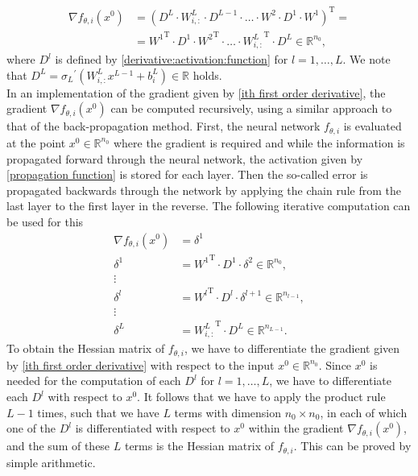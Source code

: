 \begin{equation} 
    \label{ith first order derivative}
    \begin{aligned}
        \nabla f_{\theta, i} \left(x^0\right) & = \left( D^L \cdot W^L_{i,:} \cdot D^{L-1} \cdot \ldots \cdot W^2 \cdot D^1 \cdot W^{1} \right)^{\mathrm{T}} = \\
        & = {W^{1}}^{\mathrm{T}} \cdot D^{1} \cdot {W^{2}}^{\mathrm{T}} \cdot \ldots \cdot {W^L_{i,:}}^{\mathrm{T}}  \cdot  D^{L} \in \mathbb{R}^{n_0}, 
    \end{aligned} 
\end{equation} 
where $D^l$ is defined by \cref{derivative:activation:function} for $l = 1, \ldots, L$. We note that $D^L = {\sigma_{L}}^{\prime} \left( W^L_{i,:} x^{L-1} + b^{L}_{i} \right) \in \mathbb{R}$ holds.  \\
In an implementation of the gradient given by \cref{ith first order derivative}, the gradient $\nabla f_{\theta, i} \left(x^0\right)$ can be computed recursively, using a similar approach to that of the back-propagation method. First, the neural network $f_{\theta, i}$ is evaluated at the point $x^0 \in \mathbb{R}^{n_0}$ where the gradient is required and while the information is propagated forward through the neural network, the activation given by \cref{propagation function} is stored for each layer. Then the so-called error is propagated backwards through the network by applying the chain rule from the last layer to the first layer in the reverse. The following iterative computation can be used for this
\begin{equation} 
    \label{gradient recursive}
    \begin{aligned}
        \nabla f_{\theta, i} \left(x^0\right) & = \delta^1 \\
        \delta^1 & = {W^{1}}^{\mathrm{T}} \cdot D^{1} \cdot \delta^2 \in \mathbb{R}^{n_0}, \\
        \vdots & \\
        \delta^l & = {W^{l}}^{\mathrm{T}} \cdot D^{l} \cdot \delta^{l+1} \in \mathbb{R}^{n_{l-1}}, \\
        \vdots & \\
        \delta^{L} & = {W^L_{i,:}}^{\mathrm{T}} \cdot D^{L} \in \mathbb{R}^{n_{L-1}}.
    \end{aligned} 
\end{equation} 
To obtain the Hessian matrix of $f_{\theta, i}$, we have to differentiate the gradient given by \cref{ith first order derivative} with respect to the input $x^0 \in \mathbb{R}^{n_0}$. Since $x^0$ is needed for the computation of each $D^l$ for $l = 1, \ldots, L$, we have to differentiate each $D^l$ with respect to $x^0$. It follows that we have to apply the product rule $L-1$ times, such that we have $L$ terms with dimension $n_0 \times n_0$, in each of which one of the $D^l$ is differentiated with respect to $x^0$ within the gradient $\nabla f_{\theta, i} \left(x^0\right)$, and the sum of these $L$ terms is the Hessian matrix of $f_{\theta, i}$. This can be proved by simple arithmetic. \\
